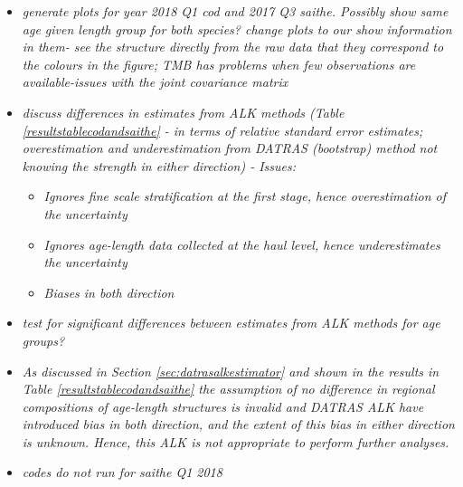 \documentclass[a4paper 12pt]{article}
\numberwithin{equation}{section}
\begin{document}
\begin{itemize}
\item \emph{generate plots for year 2018 Q1 cod and 2017 Q3 saithe. Possibly show same age given length group for both species? change plots to our show information in them- see the structure directly from the raw data that they correspond to the colours in the figure; TMB has problems when few observations are available-issues with the joint covariance matrix }
\item \emph{discuss differences in estimates from ALK methods (Table \ref{resultstablecodandsaithe} - in terms of relative standard error estimates; overestimation and underestimation from DATRAS (bootstrap) method not knowing the strength in either direction) - Issues:}
\begin{itemize}
\item \emph{Ignores fine scale stratification at the first stage, hence overestimation of the uncertainty}
\item \emph{Ignores age-length data collected at the haul level, hence underestimates the uncertainty}
\item \emph{Biases in both direction}
\end{itemize}
\item \emph{test for significant differences between estimates from ALK methods for age groups?}
\item \emph{As discussed in Section \ref{sec:datrasalkestimator} and shown in the results in Table \ref{resultstablecodandsaithe} the assumption of no difference in regional compositions of age-length structures is invalid and DATRAS ALK have introduced bias in both direction, and the extent of this  bias in either direction is unknown. Hence, this ALK is not appropriate to perform further analyses. }
\item \emph{codes do not run for saithe Q1 2018}
\end{itemize}
\end{document}
